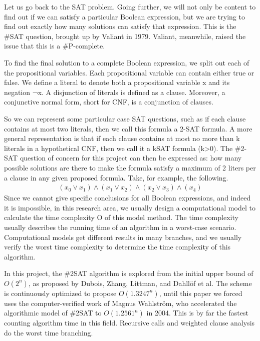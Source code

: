 \documentclass{sigchi}
\begin{document}
Let us go back to the SAT problem. Going further, we will not only be content to find out if we can satisfy a particular Boolean expression, but we are trying to find out exactly how many solutions can satisfy that expression. This is the \#SAT question, brought up by Valiant in 1979.\cite{10.1016/0304-3975(79)90044-6} Valiant, meanwhile, raised the issue that this is a \#P-complete.

To find the final solution to a complete Boolean expression, we split out each of the propositional variables. Each propositional variable can contain either true or false. We define a literal to denote both a propositional variable x and its negation ¬x. A disjunction of literals is defined as a clause. Moreover, a conjunctive normal form, short for CNF, is a conjunction of clauses.

So we can represent some particular case SAT questions, such as if each clause contains at most two literals, then we call this formula a 2-SAT formula. A more general representation is that if each clause contains at most no more than k literals in a hypothetical CNF, then we call it a k\-SAT formula (k>0). The \#2-SAT question of concern for this project can then be expressed as: how many possible solutions are there to make the formula satisfy a maximum of 2 liters per a clause in any given proposed formula. Take, for example, the following.
\begin{align*}  
\left ( x_{0}\vee x_{1} \right )\wedge \left ( x_{1}\vee x_{2} \right )\wedge \left ( x_{2}\vee  x_{3} \right )\wedge \left ( x_{4}\right )
\end{align*}
Since we cannot give specific conclusions for all Boolean expressions, and indeed it is impossible, in this research area, we usually design a computational model to calculate the time complexity O of this model method. The time complexity usually describes the running time of an algorithm in a worst-case scenario. Computational models get different results in many branches, and we usually verify the worst time complexity to determine the time complexity of this algorithm.

In this project, the \#2SAT algorithm is explored from the initial upper bound of $ O\left ( 2^{n} \right )$, as proposed by Dubois, Zhang, Littman, and Dahllöf\cite{10.1007/3-540-45655-4_57} et al. The scheme is continuously optimized to propose $ O\left ( 1.3247^{n} \right )$, until this paper we forced uses the computer-verified work of Magnus Wahlström, who accelerated the algorithmic model of \#2SAT to $ O\left ( 1.2561^{n} \right )$ in 2004\cite{10.1016/j.tcs.2004.10.037}. This is by far the fastest counting algorithm time in this field. Recursive calls and weighted clause analysis do the worst time branching.
\end{document}
